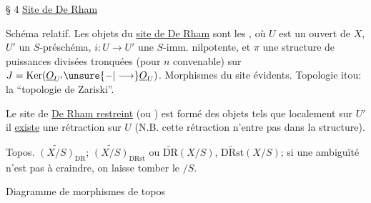 § 4 \uline{Site de De Rham}


Schéma relatif. Les objets du \uline{site de De Rham}  sont les   , où $U$ est un ouvert de $X$,  $U'$ un $S$-préschéma, $i:U\longrightarrow U'$ une $S$-imm. nilpotente, et $\pi$ une structure de puissances divisées tronquées (pour $n$ convenable) sur $J=\operatorname{Ker}(\underline{O}_{U'}\unsure{-|\longrightarrow}\underline{O}_U)$. Morphismes du site évidents. Topologie itou: la ``topologie de Zariski''.

Le site de \uline{De Rham restreint} (ou  \uline{}) est formé des objets tels que localement sur $U'$ il \uline{existe} une rétraction sur $U$ (N.B. cette rétraction n'entre pas dans la structure).

Topos. $\widetilde{(X/S)}_{\mathrm{DR}}$; $\widetilde{(X/S)}_{\mathrm{DRst}}$ ou  $\widetilde{\mathrm{DR}}(X/S)$, $\widetilde{\mathrm{DRst}}(X/S)$; si une ambiguïté n'est pas à craindre, on laisse tomber le $/S$.

Diagramme de morphismes de topos
